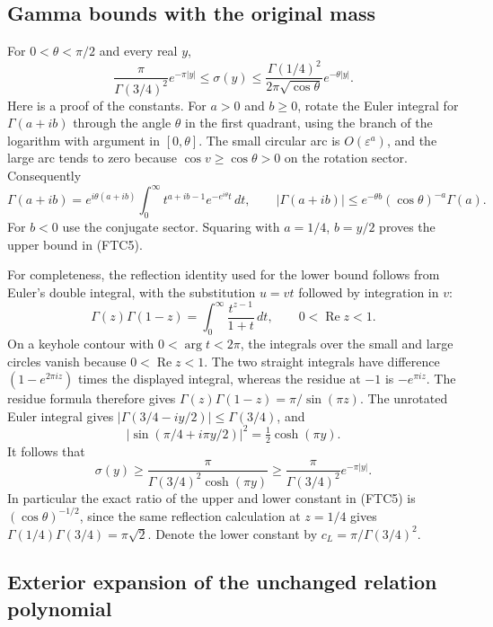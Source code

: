 \subsection{Gamma bounds with the original mass}

For $0<\theta<\pi/2$ and every real $y$,
\begin{equation}
 \frac{\pi}{\Gamma(3/4)^2}e^{-\pi|y|}
 \le\sigma(y)\le
 \frac{\Gamma(1/4)^2}{2\pi\sqrt{\cos\theta}}
 e^{-\theta|y|}.
 \tag{FTC5}
\end{equation}
Here is a proof of the constants.  For $a>0$ and $b\ge0$, rotate the
Euler integral for $\Gamma(a+ib)$ through the angle $\theta$ in the first
quadrant, using the branch of the logarithm with argument in $[0,\theta]$.
The small circular arc is $O(\varepsilon^a)$, and the large arc tends to
zero because $\cos v\ge\cos\theta>0$ on the rotation sector.  Consequently
\[
 \Gamma(a+ib)=e^{i\theta(a+ib)}
 \int_0^\infty t^{a+ib-1}e^{-e^{i\theta}t}\,dt,
 \qquad
 |\Gamma(a+ib)|\le e^{-\theta b}
 (\cos\theta)^{-a}\Gamma(a).
\]
For $b<0$ use the conjugate sector.  Squaring with $a=1/4$, $b=y/2$
proves the upper bound in (FTC5).

For completeness, the reflection identity used for the lower bound follows
from Euler's double integral, with the substitution $u=vt$ followed by
integration in $v$:
\[
 \Gamma(z)\Gamma(1-z)=\int_0^\infty\frac{t^{z-1}}{1+t}\,dt,
 \qquad 0<\operatorname{Re}z<1.
\]
On a keyhole contour with $0<\arg t<2\pi$, the integrals over the small
and large circles vanish because $0<\operatorname{Re}z<1$.  The two
straight integrals have difference $(1-e^{2\pi iz})$ times the displayed
integral, whereas the residue at $-1$ is $-e^{\pi iz}$.  The residue formula
therefore gives $\Gamma(z)\Gamma(1-z)=\pi/\sin(\pi z)$.
The unrotated Euler integral gives
$|\Gamma(3/4-iy/2)|\le\Gamma(3/4)$, and
\[
 |\sin(\pi/4+i\pi y/2)|^2=\tfrac12\cosh(\pi y).
\]
It follows that
\[
 \sigma(y)\ge\frac{\pi}{\Gamma(3/4)^2\cosh(\pi y)}
 \ge\frac{\pi}{\Gamma(3/4)^2}e^{-\pi|y|}.
\]
In particular the exact ratio of the upper and lower constant in (FTC5)
is $(\cos\theta)^{-1/2}$, since the same reflection calculation at $z=1/4$
gives $\Gamma(1/4)\Gamma(3/4)=\pi\sqrt2$.  Denote the lower constant by
$c_L=\pi/\Gamma(3/4)^2$.

\subsection{Exterior expansion of the unchanged relation polynomial}

